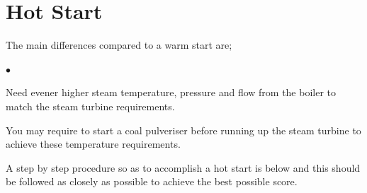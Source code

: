 \documentclass[10pt,a4paper]{article}
\begin{document}
\section*{Hot Start}\label{proc:hotstart}
The main differences compared to a warm start are;
\begin{list}{$\bullet$}{}
\item Need evener higher steam temperature, pressure and flow from the boiler to match the steam turbine requirements.
\item You may require to start a coal pulveriser before running up the steam turbine to achieve these temperature requirements.
\end{list}

A step by step procedure so as to accomplish a hot start is below and this should be followed as closely as possible to achieve the best possible score.
\end{document}
